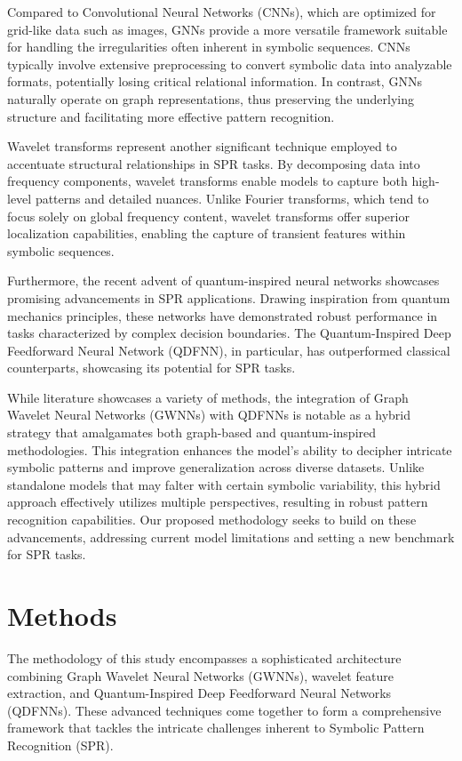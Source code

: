 \documentclass{article}
\begin{document}
Compared to Convolutional Neural Networks (CNNs), which are optimized for grid-like data such as images, GNNs provide a more versatile framework suitable for handling the irregularities often inherent in symbolic sequences. CNNs typically involve extensive preprocessing to convert symbolic data into analyzable formats, potentially losing critical relational information. In contrast, GNNs naturally operate on graph representations, thus preserving the underlying structure and facilitating more effective pattern recognition.

Wavelet transforms represent another significant technique employed to accentuate structural relationships in SPR tasks. By decomposing data into frequency components, wavelet transforms enable models to capture both high-level patterns and detailed nuances. Unlike Fourier transforms, which tend to focus solely on global frequency content, wavelet transforms offer superior localization capabilities, enabling the capture of transient features within symbolic sequences.

Furthermore, the recent advent of quantum-inspired neural networks showcases promising advancements in SPR applications. Drawing inspiration from quantum mechanics principles, these networks have demonstrated robust performance in tasks characterized by complex decision boundaries. The Quantum-Inspired Deep Feedforward Neural Network (QDFNN), in particular, has outperformed classical counterparts, showcasing its potential for SPR tasks.

While literature showcases a variety of methods, the integration of Graph Wavelet Neural Networks (GWNNs) with QDFNNs is notable as a hybrid strategy that amalgamates both graph-based and quantum-inspired methodologies. This integration enhances the model's ability to decipher intricate symbolic patterns and improve generalization across diverse datasets. Unlike standalone models that may falter with certain symbolic variability, this hybrid approach effectively utilizes multiple perspectives, resulting in robust pattern recognition capabilities. Our proposed methodology seeks to build on these advancements, addressing current model limitations and setting a new benchmark for SPR tasks.

\section{Methods}

The methodology of this study encompasses a sophisticated architecture combining Graph Wavelet Neural Networks (GWNNs), wavelet feature extraction, and Quantum-Inspired Deep Feedforward Neural Networks (QDFNNs). These advanced techniques come together to form a comprehensive framework that tackles the intricate challenges inherent to Symbolic Pattern Recognition (SPR).
\end{document}
